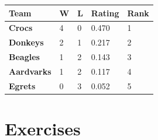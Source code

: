 \documentclass[
]{book}
\theoremstyle{definition}
\theoremstyle{definition}
\theoremstyle{definition}
\theoremstyle{definition}
\theoremstyle{remark}
\begin{document}
\begin{longtable}[]{@{}lllll@{}}
\toprule\noalign{}
\textbf{Team} & W & L & Rating & Rank \\
\midrule\noalign{}
\endhead
\bottomrule\noalign{}
\endlastfoot
\textbf{Crocs} & 4 & 0 & 0.470 & 1 \\
\textbf{Donkeys} & 2 & 1 & 0.217 & 2 \\
\textbf{Beagles} & 1 & 2 & 0.143 & 3 \\
\textbf{Aardvarks} & 1 & 2 & 0.117 & 4 \\
\textbf{Egrets} & 0 & 3 & 0.052 & 5 \\
\end{longtable}

\section{Exercises}\label{exercises-2}
\end{document}
